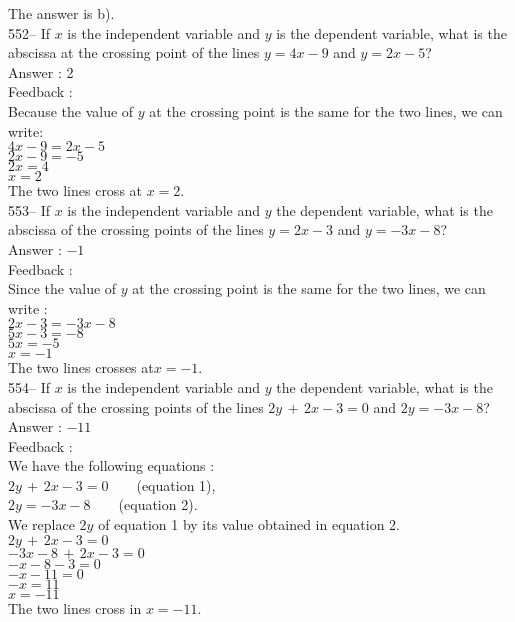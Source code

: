 \documentclass[letterpaper, 12pt]{article}
\begin{document}
The answer is b).\\


552-- If $x$ is the independent variable and $y$ is the dependent variable,
what is the abscissa at the crossing point of the lines $y=4x-9$ and
$y=2x-5$?\\

Answer : 2\\

Feedback : \\
Because the value of $y$ at the crossing point is the same for the two lines, we can write:\\
$4x-9=2x-5$\\
$2x-9=-5$\\
$2x=4$\\
$x=2$\\

The two lines cross at $x=2$.\\

553-- If $x$ is the independent variable and $y$ the dependent variable,
what is the abscissa of the crossing points of the lines $y=2x-3$ and
$y=-3x-8$?\\

Answer : $-1$\\

Feedback : \\
Since the value of $y$ at the crossing point is the same for the two lines, we can write :\\
$2x-3=-3x-8$\\
$5x-3=-8$\\
$5x=-5$\\
$x=-1$\\

The two lines crosses at$x=-1$.\\

554-- If $x$ is the independent variable and $y$ the dependent variable,
what is the abscissa of the crossing points of the lines $2y\,+\,2x-3=0$ and
$2y=-3x-8$?\\

Answer : $-11$\\

Feedback : \\
We have the following equations :\\
$2y\,+\,2x-3=0  \qquad $(equation 1),\\
$2y=-3x-8  \qquad $(equation 2).\\

We replace $2y$ of equation 1 by its value obtained in  equation 2.\\
$2y\,+\,2x-3=0$\\
$-3x-8\,+\,2x-3=0$\\
$-x-8-3=0$\\
$-x-11=0$\\
$-x=11$\\
$x=-11$\\
The two lines cross in $x=-11$.\\
\end{document}
